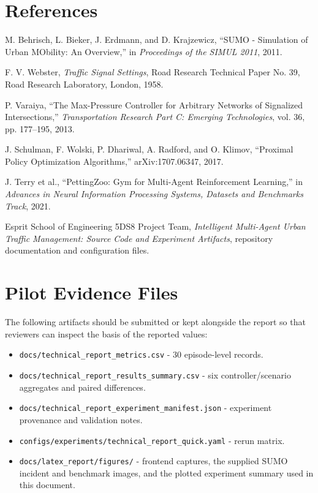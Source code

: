 \documentclass[11pt,a4paper]{article}
\begin{document}
\section*{References}
\begin{enumerate}[label={[\arabic*]},leftmargin=2.1em]
  \item M. Behrisch, L. Bieker, J. Erdmann, and D. Krajzewicz,
  ``SUMO - Simulation of Urban MObility: An Overview,'' in
  \emph{Proceedings of the SIMUL 2011}, 2011.
  \item F. V. Webster, \emph{Traffic Signal Settings}, Road Research Technical Paper
  No. 39, Road Research Laboratory, London, 1958.
  \item P. Varaiya, ``The Max-Pressure Controller for Arbitrary Networks of Signalized
  Intersections,'' \emph{Transportation Research Part C: Emerging Technologies},
  vol. 36, pp. 177--195, 2013.
  \item J. Schulman, F. Wolski, P. Dhariwal, A. Radford, and O. Klimov,
  ``Proximal Policy Optimization Algorithms,'' arXiv:1707.06347, 2017.
  \item J. Terry et al., ``PettingZoo: Gym for Multi-Agent Reinforcement Learning,''
  in \emph{Advances in Neural Information Processing Systems, Datasets and
  Benchmarks Track}, 2021.
  \item Esprit School of Engineering 5DS8 Project Team,
  \emph{Intelligent Multi-Agent Urban Traffic Management: Source Code and
  Experiment Artifacts}, repository documentation and configuration files.
\end{enumerate}

\appendix
\section{Pilot Evidence Files}
The following artifacts should be submitted or kept alongside the report so that
reviewers can inspect the basis of the reported values:
\begin{itemize}
  \item \texttt{docs/technical\_report\_metrics.csv} - 30 episode-level records.
  \item \texttt{docs/technical\_report\_results\_summary.csv} - six controller/scenario
  aggregates and paired differences.
  \item \texttt{docs/technical\_report\_experiment\_manifest.json} - experiment
  provenance and validation notes.
  \item \texttt{configs/experiments/technical\_report\_quick.yaml} - rerun matrix.
  \item \texttt{docs/latex\_report/figures/} - frontend captures, the supplied SUMO
  incident and benchmark images, and the plotted experiment summary used in this
  document.
\end{itemize}
\end{document}
